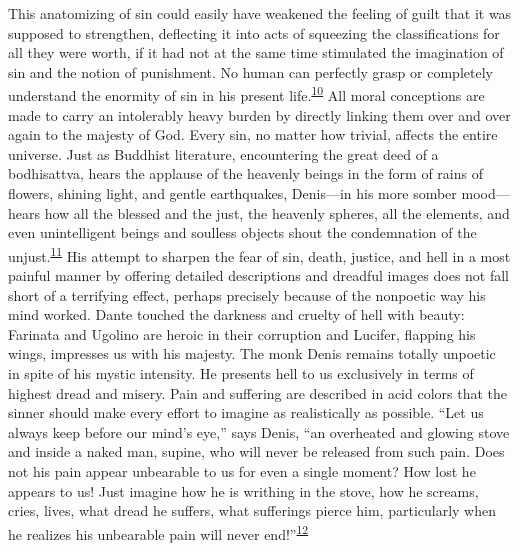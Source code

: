 This anatomizing of sin could easily have weakened the feeling of guilt
that it was supposed to strengthen, deflecting it into acts of squeezing
the classifications for all they were worth, if it had not at the same
time stimulated the imagination of sin and the notion of punishment. No
human can perfectly grasp or completely understand the enormity of sin
in his present
life.\textsuperscript{\protect\hypertarget{17_Chapter_Ten__THE_FAILURE_OF_IMAG.xhtmlux5cux23id_716}{\protect\hyperlink{23_NOTES.xhtmlux5cux23id_717}{10}}}
All moral conceptions are made to carry an intolerably heavy burden by
directly linking them over and over again to the majesty of God. Every
sin, no matter how trivial, affects the entire universe. Just as
Buddhist literature, encountering the great deed of a bodhisattva, hears
the applause of the heavenly beings in the form of rains of flowers,
shining light, and gentle earthquakes, Denis---in his more somber
mood---hears how all the blessed and the just, the heavenly spheres, all
the elements, and even unintelligent beings and soulless objects shout
the condemnation of the
unjust.\textsuperscript{\protect\hypertarget{17_Chapter_Ten__THE_FAILURE_OF_IMAG.xhtmlux5cux23id_714}{\protect\hyperlink{23_NOTES.xhtmlux5cux23id_715}{11}}}
His attempt to sharpen the fear of sin, death, justice, and hell in a
most painful manner by offering detailed descriptions and dreadful
images does not fall short of a terrifying effect, perhaps precisely
because of the nonpoetic way his mind worked. Dante touched the darkness
and cruelty of hell with beauty: Farinata and Ugolino are heroic in
their corruption and Lucifer, flapping his wings, impresses us with his
majesty. The monk Denis remains totally unpoetic in spite of his mystic
intensity. He presents hell to us exclusively in terms of highest dread
and misery. Pain and suffering are described in acid colors
\protect\hypertarget{17_Chapter_Ten__THE_FAILURE_OF_IMAG.xhtmlux5cux23page_253}{}{}that
the sinner should make every effort to imagine as realistically as
possible. ``Let us always keep before our mind's eye,'' says Denis, ``an
overheated and glowing stove and inside a naked man, supine, who will
never be released from such pain. Does not his pain appear unbearable to
us for even a single moment? How lost he appears to us! Just imagine how
he is writhing in the stove, how he screams, cries, lives, what dread he
suffers, what sufferings pierce him, particularly when he realizes his
unbearable pain will never
end!''\textsuperscript{\protect\hypertarget{17_Chapter_Ten__THE_FAILURE_OF_IMAG.xhtmlux5cux23id_712}{\protect\hyperlink{23_NOTES.xhtmlux5cux23id_713}{12}}}

